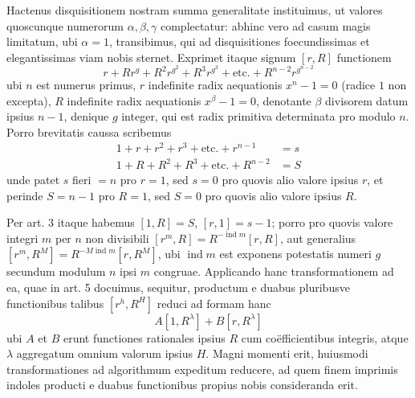 Hactenus disquisitionem nostram summa generalitate instituimus, ut valores quoscunque numerorum $\alpha,\beta,\gamma$ complectatur: abhinc vero ad casum magis limitatum, ubi $\alpha=1$, transibimus, qui ad disquisitiones foecundissimas et elegantissimas viam nobis sternet. Exprimet itaque signum $[r,R]$ functionem
\[
r+Rr^g+R^2r^{g^2}+R^3r^{g^3}+\text{etc.}+R^{n-2}r^{g^{n-2}}
\]
ubi $n$ est numerus primus, $r$ indefinite radix aequationis $x^n-1=0$ (radice $1$ non excepta), $R$ indefinite radix aequationis $x^\beta-1=0$, denotante $\beta$ divisorem datum ipsius $n-1$, denique $g$ integer, qui est radix primitiva determinata pro modulo $n$. Porro brevitatis caussa scribemus
\[
\begin{aligned}
1+r+r^2+r^3+\text{etc.}+r^{n-1}&=s\\
1+R+R^2+R^3+\text{etc.}+R^{n-2}&=S
\end{aligned}
\]
unde patet $s$ fieri $=n$ pro $r=1$, sed $s=0$ pro quovis alio valore ipsius $r$, et perinde $S=n-1$ pro $R=1$, sed $S=0$ pro quovis alio valore ipsius $R$.

Per art. 3 itaque habemus $[1,R]=S$, $[r,1]=s-1$; porro pro quovis valore integri $m$ per $n$ non divisibili $[r^m,R]=R^{-\operatorname{ind}m}[r,R]$, aut generalius $[r^m,R^M]=R^{-M\operatorname{ind}m}[r,R^M]$, ubi $\operatorname{ind}m$ est exponens potestatis numeri $g$ secundum modulum $n$ ipsi $m$ congruae. Applicando hanc transformationem ad ea, quae in art. 5 docuimus, sequitur, productum e duabus pluribusve functionibus talibus $[r^h,R^H]$ reduci ad formam hanc
\[
A[1,R^\lambda]+B[r,R^\lambda]
\]
ubi $A$ et $B$ erunt functiones rationales ipsius $R$ cum coëfficientibus integris, atque $\lambda$ aggregatum omnium valorum ipsius $H$. Magni momenti erit, huiusmodi transformationes ad algorithmum expeditum reducere, ad quem finem imprimis indoles producti e duabus functionibus propius nobis consideranda erit.

